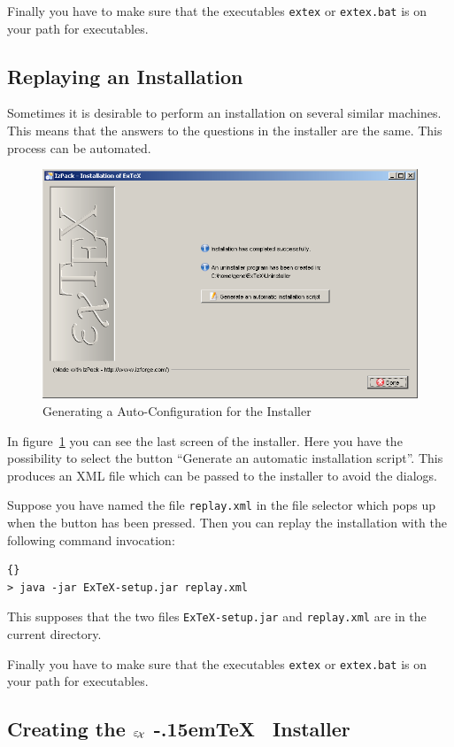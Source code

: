 \documentclass[12pt,div12,a4paper]{scrbook}
\providecommand*{\ExTeX}{\ifx\texorpdfstring\undefined
  \textrm{%
    \ensuremath{\textstyle\varepsilon_{\kern-0.15em\mathcal{X}}}%
    \kern-.15em\TeX}%
  \else\texorpdfstring{%
  \textrm{%
    \ensuremath{\textstyle\varepsilon_{\kern-0.15em\mathcal{X}}}%
    \kern-.15em\TeX
  }}{ExTeX}%
  \fi
}
\begin{document}
Finally you have to make sure that the executables \texttt{extex} or
\texttt{extex.bat} is on your path for executables.


\subsection{Replaying an Installation}

Sometimes it is desirable to perform an installation on several
similar machines. This means that the answers to the questions in the
installer are the same. This process can be automated.
\begin{figure}[tp]
  \centering
  \includegraphics[width=.8\textwidth]{inst8.png}
  \caption{Generating a Auto-Configuration for the Installer}
  \label{fig:inst8}
\end{figure}

In figure~\ref{fig:inst8} you can see the last screen of the
installer. Here you have the possibility to select the button
``Generate an automatic installation script''. This produces an XML
file which can be passed to the installer to avoid the dialogs.

Suppose you have named the file \texttt{replay.xml} in the file
selector which pops up when the button has been pressed. Then you can
replay the installation with the following command invocation:

\begin{lstlisting}{}
> java -jar ExTeX-setup.jar replay.xml
\end{lstlisting}

This supposes that the two files \texttt{ExTeX-setup.jar} and
\texttt{replay.xml} are in the current directory.

Finally you have to make sure that the executables \texttt{extex} or
\texttt{extex.bat} is on your path for executables.


\subsection{Creating the \ExTeX\ Installer}
\end{document}
